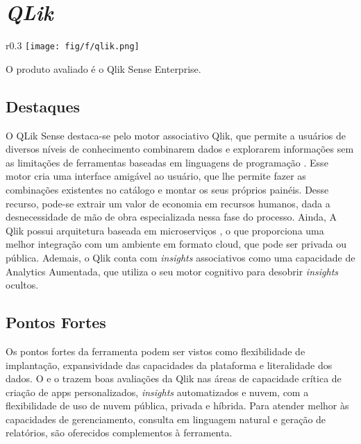 \section{\emph{QLik}}
\label{sub-qlik}

\begin{wrapfigure}[3]{r}{0.3\textwidth}     
    \centering
    \texttt{[image: fig/f/qlik.png]}
\end{wrapfigure}

O produto avaliado é o Qlik Sense Enterprise.

\subsection*{Destaques}

O QLik Sense destaca-se pelo motor associativo Qlik, que permite a usuários de diversos níveis de conhecimento combinarem dados e explorarem informações sem as limitações de ferramentas baseadas em linguagens de programação \cite{gartner:magicquadrant}. Esse motor cria uma interface amigável ao usuário, que lhe permite fazer as combinações existentes no catálogo e montar os seus próprios painéis. Desse recurso, pode-se extrair um valor de economia em recursos humanos, dada a desnecessidade de mão de obra especializada nessa fase do processo. Ainda, A Qlik possui arquitetura baseada em microserviços \cite{gartner:magicquadrant}, o que proporciona uma melhor integração com um ambiente em formato cloud, que pode ser privada ou pública. Ademais, o Qlik conta com \emph{insights} associativos como uma capacidade de Analytics Aumentada, que utiliza o seu motor cognitivo para desobrir \emph{insights} ocultos.

\subsection*{Pontos Fortes}

Os pontos fortes da ferramenta podem ser vistos como flexibilidade de implantação, expansividade das capacidades da plataforma e literalidade dos dados\cite{gartner:magicquadrant}. O \relGMQ \xspace e o \relGCC \xspace trazem boas avaliações da Qlik nas áreas de capacidade crítica de criação de apps personalizados, \emph{insights} automatizados e nuvem, com a flexibilidade de uso de nuvem pública, privada e híbrida. Para atender melhor às capacidades de gerenciamento, consulta em linguagem natural e geração de relatórios, são oferecidos complementos à ferramenta. 

